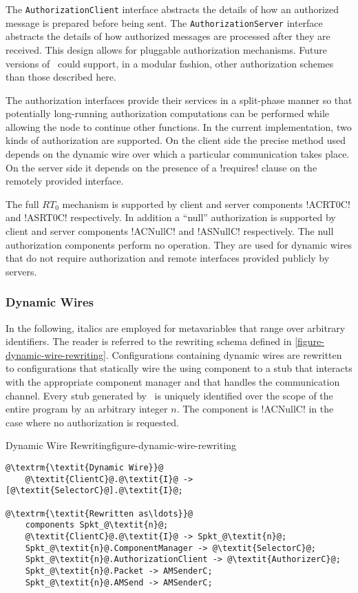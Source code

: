 The \texttt{AuthorizationClient} interface abstracts the details of how an authorized message is
prepared before being sent. The \texttt{AuthorizationServer} interface abstracts the details of
how authorized messages are processed after they are received. This design allows for pluggable
authorization mechanisms. Future versions of \Sprocket\ could support, in a modular fashion,
other authorization schemes than those described here.

The authorization interfaces provide their services in a split-phase manner so that potentially
long-running authorization computations can be performed while allowing the node to continue
other functions. In the current implementation, two kinds of authorization are supported. On the
client side the precise method used depends on the dynamic wire over which a particular
communication takes place. On the server side it depends on the presence of a !requires! clause
on the remotely provided interface.

The full $RT_0$ mechanism is supported by client and server components !ACRT0C! and !ASRT0C!
respectively. In addition a ``null'' authorization is supported by client and server components
!ACNullC! and !ASNullC! respectively. The null authorization components perform no operation.
They are used for dynamic wires that do not require authorization and remote interfaces provided
publicly by servers.

\subsubsection{Dynamic Wires}

In the following, italics are employed for metavariables that range over arbitrary identifiers. The
reader is referred to the rewriting schema defined in \autoref{figure-dynamic-wire-rewriting}.
Configurations containing dynamic wires are rewritten to configurations that statically wire the
using component  to a stub  that interacts with
the appropriate component manager  and that handles the communication
channel. Every stub generated by \Sprocket\ is uniquely identified over the scope of the entire
program by an arbitrary integer $n$. The  component is !ACNullC! in
the case where no authorization is requested.

\begin{fpfig}[t]{Dynamic Wire Rewriting}{figure-dynamic-wire-rewriting}
{
\singlespace
\begin{lstlisting}[escapechar=@]
@\textrm{\textit{Dynamic Wire}}@
    @\textit{ClientC}@.@\textit{I}@ -> [@\textit{SelectorC}@].@\textit{I}@;

@\textrm{\textit{Rewritten as\ldots}}@
    components Spkt_@\textit{n}@;
    @\textit{ClientC}@.@\textit{I}@ -> Spkt_@\textit{n}@;
    Spkt_@\textit{n}@.ComponentManager -> @\textit{SelectorC}@;
    Spkt_@\textit{n}@.AuthorizationClient -> @\textit{AuthorizerC}@;
    Spkt_@\textit{n}@.Packet -> AMSenderC;
    Spkt_@\textit{n}@.AMSend -> AMSenderC;
\end{lstlisting}
\primaryspacing
}
\end{fpfig}

